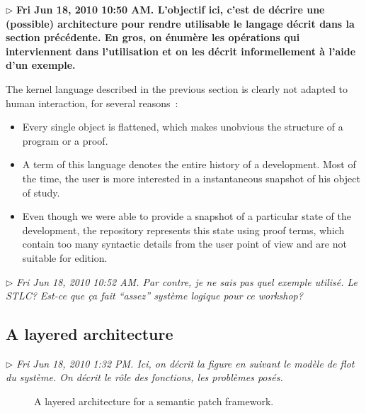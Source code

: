 \documentclass{article}
\newcommand{\remplan}[1]{\noindent\textcolor{bwblue}{$\triangleright$ \textbf{#1}}}
\newcommand{\remtext}[1]{\textcolor{bwgreen}{$\triangleright$ \textsl{#1}}}
\begin{document}
\remplan{Fri Jun 18, 2010 10:50 AM. L'objectif ici, c'est de décrire
  une (possible) architecture pour rendre utilisable le langage 
  décrit dans la section précédente. En gros, on énumère les 
  opérations qui interviennent dans l'utilisation et on les décrit
  informellement à l'aide d'un exemple.}

The kernel language described in the previous section is clearly not
adapted to human interaction, for several reasons~: 
\begin{itemize}

\item Every single object is flattened, which makes unobvious the
  structure of a program or a proof. 

\item A term of this language denotes the entire history of a
  development. Most of the time, the user is more interested in a
  instantaneous snapshot of his object of study.

\item Even though we were able to provide a snapshot of a particular
  state of the development, the repository represents this state 
  using proof terms, which contain too many syntactic details from the
  user point of view and are not suitable for edition.  

\end{itemize}

\remtext{Fri Jun 18, 2010 10:52 AM. Par contre, je ne sais pas quel
  exemple utilisé. Le STLC? Est-ce que ça fait ``assez'' système
  logique pour ce workshop?}

\subsection{A layered architecture}

\remtext{Fri Jun 18, 2010  1:32 PM. Ici, on décrit la figure en suivant
  le modèle de flot du système. On décrit le rôle des fonctions, 
les problèmes posés.}

\begin{figure}
\begin{center}
\end{center}
\label{fig:architecture}
\caption{A layered architecture for a semantic patch framework.}
\end{figure}
\end{document}
